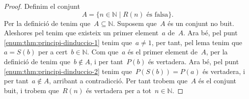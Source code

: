 \documentclass[../../main.tex]{subfiles}
\begin{document}
    \begin{proof}
        Definim el conjunt
        \[
            A=\{n\in\mathbb{N}\mid R(n)\text{ és falsa}\}.
        \]
        Per la definició de  tenim que~\(A\subseteq\mathbb{N}\).
        Suposem que~\(A\) és un conjunt no buit.
        Aleshores pel  tenim que existeix un primer element~\(a\) de~\(A\).
        Ara bé, pel punt \eqref{enum:thm:principi-dinduccio-1} tenim que~\(a\neq1\), per tant, pel lema  tenim que~\(a=S(b)\) per a cert~\(b\in\mathbb{N}\).
        Com que~\(a\) és el primer element de~\(A\), per la definició de  tenim que~\(b\notin A\), i per tant~\(P(b)\) és vertadera.
        Ara bé, pel punt \eqref{enum:thm:principi-dinduccio-2} tenim que~\(P(S(b))=P(a)\) és vertadera, i per tant~\(a\notin A\), arribant a contradicció.
        Per tant trobem que~\(A\) és el conjunt buit, i trobem que~\(R(n)\) és vertadera per a tot~\(n\in\mathbb{N}\).
    \end{proof}
\end{document}

